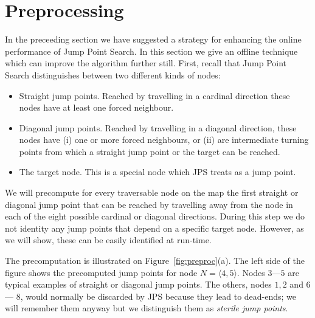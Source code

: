 
\section{Preprocessing}
\label{sec::preprocessing}
In the preceeding section we have suggested a strategy for enhancing the
online performance of Jump Point Search.  In this section we give an offline
technique which can improve the algorithm further still. First, recall that 
Jump Point Search distinguishes between two different kinds of
nodes:
\begin{itemize}
\item Straight jump points. Reached by travelling in a
cardinal direction these nodes have at least one forced neighbour.
\item Diagonal jump points. Reached by travelling in a diagonal direction, 
these nodes have (i) one or more forced neighbours, or (ii) are 
intermediate turning points from which a straight jump point or the 
target can be reached.
\item The target node. This is a special node which JPS treats as a jump point.
\end{itemize}

We will precompute for every traversable node on the map the first
straight or diagonal jump point that can be reached by travelling 
away from the node in each of the eight possible cardinal or diagonal 
directions. During this step we do not identity any jump points that 
depend on a specific target node.  However, as we will show, these 
can be easily identified at run-time. 


The precomputation is illustrated on Figure~\ref{fig:preproc}(a).
The left side of the figure shows the precomputed jump points 
for node $N = \langle 4,5\rangle$.  
Nodes $3$---$5$ are typical examples of straight or diagonal 
jump points.  
The others, nodes $1, 2$ and $6$ --- $8$, would normally be discarded 
by JPS because they lead to dead-ends; we will remember them 
anyway but we distinguish them as \emph{sterile jump points}.  

